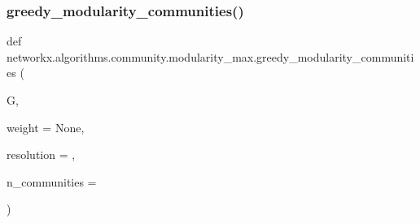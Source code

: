 \subsubsection{\texorpdfstring{greedy\+\_\+modularity\+\_\+communities()}{greedy\_modularity\_communities()}}
{\footnotesize\ttfamily def networkx.\+algorithms.\+community.\+modularity\+\_\+max.\+greedy\+\_\+modularity\+\_\+communities (\begin{DoxyParamCaption}\item[{}]{G,  }\item[{}]{weight = {\ttfamily None},  }\item[{}]{resolution = {},  }\item[{}]{n\+\_\+communities = {} }\end{DoxyParamCaption})}

